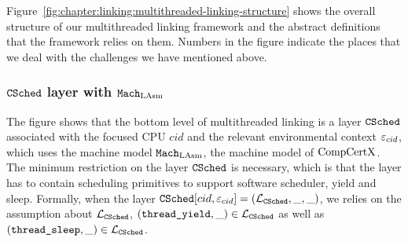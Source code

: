 Figure~\ref{fig:chapter:linking:multithreaded-linking-structure} shows the overall structure of our multithreaded linking framework and the abstract definitions that the framework relies on them.
Numbers in the figure indicate the places that we deal with the challenges we have mentioned above.

\subsubsection{${{\mathrm{\texttt{CSched}}}}$ layer with ${\mathrm{\texttt{Mach}}}_{\mathrm{LAsm}}$} 


The figure shows that the bottom level of multithreaded linking is a layer ${{\mathrm{\texttt{CSched}}}}$ associated with the focused CPU $cid$ and the relevant environmental context ${\varepsilon}_{cid}$, 
which uses the machine model ${\mathrm{\texttt{Mach}}}_{\mathrm{LAsm}}$, 
the machine model of $\mathrm{CompCertX}$. 
The minimum restriction on the layer ${{\mathrm{\texttt{CSched}}}}$ is necessary, 
which is that the layer has to contain scheduling primitives to support software scheduler, yield and sleep.
Formally, 
when the layer ${{\mathrm{\texttt{CSched}}}}[cid, {\varepsilon}_{cid}] = (\mathcal{L}_{{{\mathrm{\texttt{CSched}}}}}, \_, \_)$,
we relies on the assumption about $\mathcal{L}_{{{\mathrm{\texttt{CSched}}}}}$, 
$({\mathrm{\texttt{thread\_yield}}}, \_) \in \mathcal{L}_{{{\mathrm{\texttt{CSched}}}}}$ as well as 
$({\mathrm{\texttt{thread\_sleep}}}, \_) \in \mathcal{L}_{{{\mathrm{\texttt{CSched}}}}}$. 


